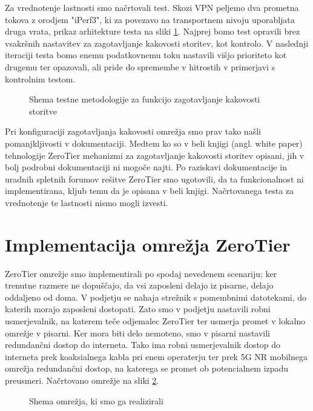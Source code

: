 \documentclass[a4paper, 12pt]{book}
\begin{document}
Za vrednotenje lastnosti smo načrtovali test. Skozi VPN peljemo dva prometna tokova z orodjem "iPerf3", ki za povezavo na transportnem nivoju uporabljata druga vrata, prikaz arhitekture testa na sliki \ref{qos_shema}. Najprej bomo test opravili brez vsakršnih nastavitev za zagotavljanje kakovosti storitev, kot kontrolo. V naslednji iteraciji testa bomo enemu podatkovnemu toku nastavili višjo prioriteto kot drugemu ter opazovali, ali pride do spremembe v hitrostih v primerjavi s kontrolnim testom.

\begin{figure}[h]
\begin{center}

\end{center}
\caption{Shema testne metodologije za funkcijo zagotavljanje kakovosti storitve \cite{rvidmar}}
\label{qos_shema}
\end{figure}
Pri konfiguraciji zagotavljanja kakovosti omrežja smo prav tako našli pomanjkljivosti v dokumentaciji. Medtem ko so v beli knjigi (angl. white paper) tehnologije ZeroTier mehanizmi za zagotavljanje kakovosti storitev opisani, jih v bolj podrobni dokumentaciji ni mogoče najti. Po raziskavi dokumentacije in uradnih spletnih forumov rešitve ZeroTier smo ugotovili, da ta funkcionalnost ni implementirana, kljub temu da je opisana v beli knjigi. Načrtovanega testa za vrednotenje te lastnosti nismo mogli izvesti.

\section{Implementacija omrežja ZeroTier}
ZeroTier omrežje smo implementirali po spodaj nevedenem scenariju; ker trenutne razmere ne dopuščajo, da vsi zaposleni delajo iz pisarne, delajo oddaljeno od doma. V podjetju se nahaja strežnik s pomembnimi datotekami, do katerih morajo zaposleni dostopati. Zato smo v podjetju nastavili robni usmerjevalnik, na katerem teče odjemalec ZeroTier ter usmerja promet v lokalno omrežje v pisarni. Ker mora biti delo nemoteno, smo v pisarni nastavili redundančni dostop do interneta. Tako ima robni usmerjevalnik dostop do interneta prek koaksialnega kabla pri enem operaterju ter prek 5G NR mobilnega omrežja redundančni dostop, na katerega se promet ob potencialnem izpadu preusmeri. Načrtovano omrežje na sliki \ref{shema_realizacije}.

\begin{figure}[h]
\begin{center}

\end{center}
\caption{Shema omrežja, ki smo ga realizirali \cite{rvidmar}}
\label{shema_realizacije}
\end{figure}
\end{document}
